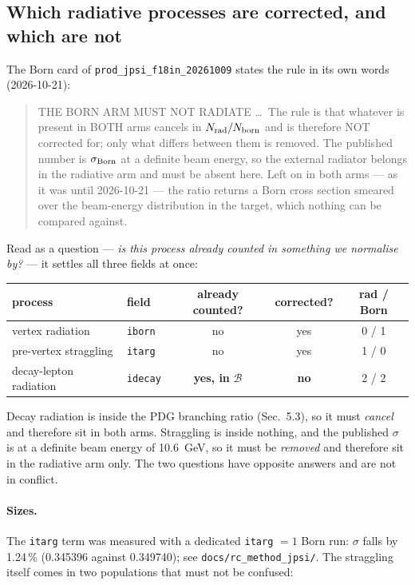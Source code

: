 \documentclass[11pt]{article}
\newcommand{\BR}{\mathcal{B}}
\begin{document}
\subsection{Which radiative processes are corrected, and which are not}

The Born card of \texttt{prod\_jpsi\_f18in\_20261009} states the rule in its own words (2026-10-21):
\begin{quote}\small
THE BORN ARM MUST NOT RADIATE \ldots\ The rule is that whatever is present in BOTH arms cancels in
$N_{\rm rad}/N_{\rm born}$ and is therefore NOT corrected for; only what differs between them is
removed. The published number is $\sigma_{\rm Born}$ at a definite beam energy, so the external
radiator belongs in the radiative arm and must be absent here. Left on in both arms --- as it was
until 2026-10-21 --- the ratio returns a Born cross section smeared over the beam-energy distribution
in the target, which nothing can be compared against.
\end{quote}

Read as a question --- \emph{is this process already counted in something we normalise by?} --- it
settles all three fields at once:

\begin{center}\small
\begin{tabular}{llccc}
\toprule
process & field & already counted? & corrected? & rad / Born \\
\midrule
vertex radiation & \texttt{iborn} & no & yes & 0 / 1 \\
pre-vertex straggling & \texttt{itarg} & no & yes & 1 / 0 \\
decay-lepton radiation & \texttt{idecay} & \textbf{yes, in} $\BR$ & \textbf{no} & 2 / 2 \\
\bottomrule
\end{tabular}
\end{center}

Decay radiation is inside the PDG branching ratio (Sec.~5.3), so it must \emph{cancel} and therefore
sit in both arms. Straggling is inside nothing, and the published $\sigma$ is at a definite beam
energy of 10.6~GeV, so it must be \emph{removed} and therefore sit in the radiative arm only. The two
questions have opposite answers and are not in conflict.

\paragraph{Sizes.} The \texttt{itarg} term was measured with a dedicated \texttt{itarg} $=1$ Born
run: $\sigma$ falls by 1.24\,\% (0.345396 against 0.349740); see \texttt{docs/rc\_method\_jpsi/}. The
straggling itself comes in two populations that must not be confused:
\end{document}
